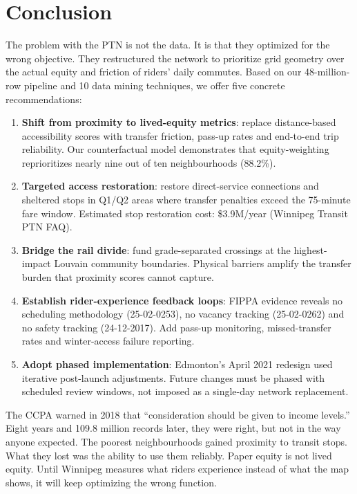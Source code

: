 \documentclass[11pt]{article}
\begin{document}
\section{Conclusion}

The problem with the PTN is not the data. It is that they optimized for the wrong objective. They restructured the network to prioritize grid geometry over the actual equity and friction of riders' daily commutes. Based on our 48-million-row pipeline and 10 data mining techniques, we offer five concrete recommendations:

\begin{enumerate}
\item \textbf{Shift from proximity to lived-equity metrics}: replace distance-based accessibility scores with transfer friction, pass-up rates and end-to-end trip reliability. Our counterfactual model demonstrates that equity-weighting reprioritizes nearly nine out of ten neighbourhoods (88.2\%).
\item \textbf{Targeted access restoration}: restore direct-service connections and sheltered stops in Q1/Q2 areas where transfer penalties exceed the 75-minute fare window. Estimated stop restoration cost: \$3.9M/year (Winnipeg Transit PTN FAQ).
\item \textbf{Bridge the rail divide}: fund grade-separated crossings at the highest-impact Louvain community boundaries. Physical barriers amplify the transfer burden that proximity scores cannot capture.
\item \textbf{Establish rider-experience feedback loops}: FIPPA evidence reveals no scheduling methodology (25-02-0253), no vacancy tracking (25-02-0262) and no safety tracking (24-12-2017). Add pass-up monitoring, missed-transfer rates and winter-access failure reporting.
\item \textbf{Adopt phased implementation}: Edmonton's April 2021 redesign used iterative post-launch adjustments. Future changes must be phased with scheduled review windows, not imposed as a single-day network replacement.
\end{enumerate}

The CCPA warned in 2018 that ``consideration should be given to income levels.'' Eight years and 109.8 million records later, they were right, but not in the way anyone expected. The poorest neighbourhoods gained proximity to transit stops. What they lost was the ability to use them reliably. Paper equity is not lived equity. Until Winnipeg measures what riders experience instead of what the map shows, it will keep optimizing the wrong function.
\end{document}
